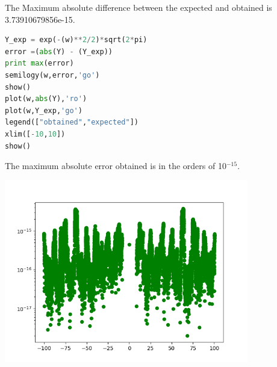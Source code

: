 \documentclass[a4paper]{article}
\begin{document}
The Maximum absolute difference between the expected and obtained is 3.73910679856e-15.

\begin{lstlisting}[language=Python]
Y_exp = exp(-(w)**2/2)*sqrt(2*pi)
error =(abs(Y) - (Y_exp))
print max(error)
semilogy(w,error,'go')
show()
plot(w,abs(Y),'ro')
plot(w,Y_exp,'go')
legend(["obtained","expected"])
xlim([-10,10])
show()
\end{lstlisting}
The maximum absolute error obtained is in the orders of 10$^{-15}$. 
\begin{center}
\includegraphics[width=0.8\textwidth]{Figure_8.png}
\end{center}
\end{document}
